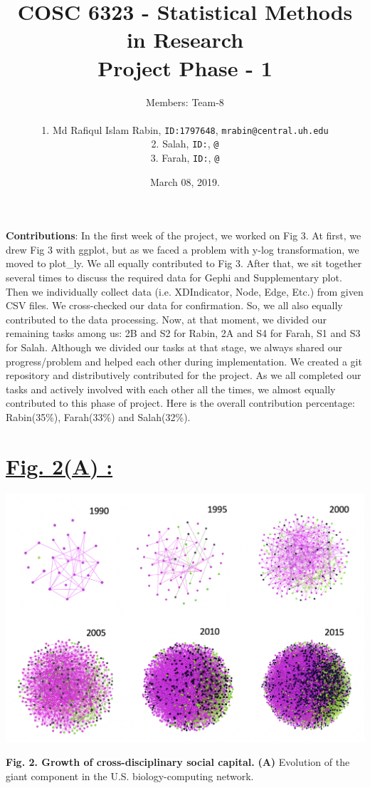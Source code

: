 \documentclass{article}\usepackage[]{graphicx}\usepackage[]{color}
\title{COSC 6323 - Statistical Methods in Research\\Project Phase - 1\\}
\author{%
    Members: Team-8 \\\\
    1. Md Rafiqul Islam Rabin, \texttt{ID:1797648}, \texttt{mrabin@central.uh.edu}\vspace{2pt} \\
    2. Salah, \texttt{ID:}, \texttt{@}\vspace{2pt} \\
    3. Farah, \texttt{ID:}, \texttt{@}\vspace{2pt} \\
}
\date{March 08, 2019.}
\begin{document}
\maketitle
\par{\textbf{Contributions}: In the first week of the project, we worked on Fig 3. At first, we drew Fig 3 with ggplot, but as we faced a problem with y-log transformation, we moved to plot\_ly. We all equally contributed to Fig 3. After that, we sit together several times to discuss the required data for Gephi and Supplementary plot. Then we individually collect data (i.e. XDIndicator, Node, Edge, Etc.) from given CSV files. We cross-checked our data for confirmation. So, we all also equally contributed to the data processing. Now, at that moment, we divided our remaining tasks among us: 2B and S2 for Rabin, 2A and S4 for Farah, S1 and S3 for Salah. Although we divided our tasks at that stage, we always shared our progress/problem and helped each other during implementation. We created a git repository and distributively contributed for the project. As we all completed our tasks and actively involved with each other all the times, we almost equally contributed to this phase of project. Here is the overall contribution percentage: Rabin(35\%), Farah(33\%) and Salah(32\%).}

\newpage
\section*{\underline{Fig. 2(A) :}}
\begin{center}
\includegraphics[scale=0.6]{2A.png}
\newline
\par{\textbf{Fig. 2. Growth of cross-disciplinary social capital.} 
\textbf{(A)} Evolution of the giant component in the U.S. biology-computing network.}
\end{center}
\end{document}
